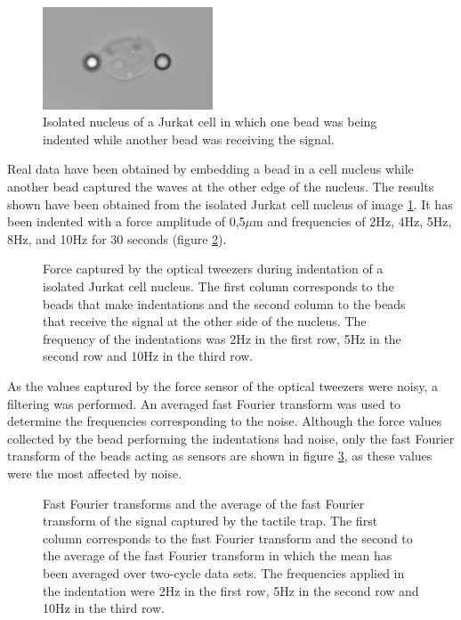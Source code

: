 \documentclass[12pt, a4paper]{article} %
\begin{document}
	\begin{figure}
		\centering
		\includegraphics[width=0.45\textwidth]{figures/recorte_nucleo.png}
		\caption{Isolated nucleus of a Jurkat cell in which one bead was being indented while another bead was receiving the signal.}
		\label{fig:myfig3}
	\end{figure}
	Real data have been obtained by embedding a bead in a cell nucleus while another bead captured the waves at the other edge of the nucleus. The results shown have been obtained from the isolated Jurkat cell nucleus of image \ref{fig:myfig3}. It has been indented with a force amplitude of 0,5$\mu$m and frequencies of 2Hz, 4Hz, 5Hz, 8Hz, and 10Hz for 30 seconds (figure \ref{fig:raw_data}).
	\setlength{\parskip}{4mm}
	\begin{figure}[htbp]
		\centering
		
		\caption{Force captured by the optical tweezers during indentation of a isolated Jurkat cell nucleus. The first column corresponds to the beads that make indentations and the second column to the beads that receive the signal at the other side of the nucleus. The frequency of the indentations was 2Hz in the first row, 5Hz in the second row and 10Hz in the third row.}
		\label{fig:raw_data}
	\end{figure}
	
	As the values captured by the force sensor of the optical tweezers were noisy, a filtering was performed. An averaged fast Fourier transform was used to determine the frequencies corresponding to the noise. Although the force values collected by the bead performing the indentations had noise, only the fast Fourier transform of the beads acting as sensors are shown in figure \ref{fig:fourier_sin_filtro}, as these values were the most affected by noise. 
	\begin{figure}[htbp]
		\centering
		
		\caption{Fast Fourier transforms and the average of the fast Fourier transform of the signal captured by the tactile trap. The first column corresponds to the fast Fourier transform and the second to the average of the fast Fourier transform in which the mean has been averaged over two-cycle data sets. The frequencies applied in the indentation were 2Hz in the first row, 5Hz in the second row and 10Hz in the third row.}
		\label{fig:fourier_sin_filtro}
	\end{figure}
	
\end{document}
